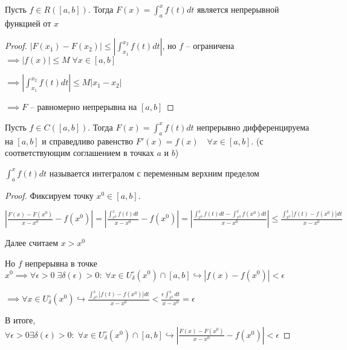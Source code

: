 \begin{lemma}
    Пусть $f \in R([a, b])$. Тогда $F(x) = \int_a^x f(t) dt$ является
    непрерывной функцией от $x$
\end{lemma}
\begin{proof}
    $|F(x_1) - F(x_2)| \leqslant \left|\int_{x_1}^{x_2} f(t)dt\right|$,
    но $f$ -- ограничена $\implies |f(x)| \leqslant M \;
    \forall x \in [a, b]$

    $\implies \left|\int_{x_1}^{x_2} f(t)dt\right|
    \leqslant M|x_1 - x_2|$

    $\implies F$ -- равномерно непрерывна на $[a, b]$ 
\end{proof}

\begin{theorem}
    Пусть $f \in C([a, b])$. Тогда $F(x) = \int_a^x f(t) dt$
    непрерывно дифференцируема на $[a, b]$ и справедливо равенство
    $F'(x) = f(x)\quad \forall x \in [a, b]$. (с соответствующим
    соглашением в точках $a$ и $b$)
\end{theorem}
\begin{note}
    $\int_a^x f(t)dt$ называется интегралом с переменным
    верхним пределом
\end{note}
\begin{proof}
    Фиксируем точку $x^0 \in [a, b]$.

    $\left|\frac{F(x) - F(x^0)}{x - x^0} - f(x^0)\right|
    = \left|\frac{\int_{x^0}^x f(t)dt}{x - x^0} - f(x^0)\right|
    = \left|\frac{\int_{x^0}^x f(t)dt - \int_{x^0}^x f(x^0)dt}{x - x^0}\right|
    \leqslant \frac{\int_{x^0}^x |f(t) - f(x^0)|dt}{x - x^0}$

    Далее считаем $x > x^0$

    Но $f$ непрерывна в точке $x^0 \implies
    \forall \epsilon > 0\; \exists \delta(\epsilon) > 0:\;
    \forall x \in U_\delta^\circ(x^0) \cap [a, b]
    \hookrightarrow |f(x) - f(x^0)| < \epsilon$

    $\implies \forall x \in U_\delta^\circ(x^0) \hookrightarrow
    \frac{\int_{x^0}^x |f(t) - f(x^0)|dt}{x - x^0}
    < \frac{\epsilon \int_{x^0}^x dt}{x - x^0} = \epsilon$

    В итоге, $\forall \epsilon > 0 \exists \delta(\epsilon) > 0:\;
    \forall x \in U_\delta^\circ(x^0) \cap [a, b]
    \hookrightarrow \left|\frac{F(x) - F(x^0)}{x - x^0} - f(x^0)\right|
    < \epsilon$
\end{proof}
